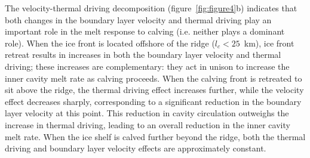 \documentclass[draft]{agujournal2019}
\begin{document}
The velocity-thermal driving decomposition (figure~\ref{fig:figure4}b) indicates that both changes in the boundary layer velocity and thermal driving play an important role in the melt response to calving (i.e. neither plays a dominant role).  When the ice front is located offshore of the ridge ($l_c < 25$~km), ice front retreat results in increases in both the boundary layer velocity and thermal driving; these increases are complementary: they act in unison to increase the inner cavity melt rate as calving proceeds. When the calving front is retreated to sit above the ridge, the thermal driving effect increases further, while the velocity effect decreases sharply, corresponding to a significant reduction in the boundary layer velocity at this point. This reduction in cavity circulation outweighs the increase in thermal driving, leading to an overall reduction in the inner cavity melt rate. When the ice shelf is calved further beyond the ridge, both the thermal driving and boundary layer velocity effects are approximately constant.
\end{document}
